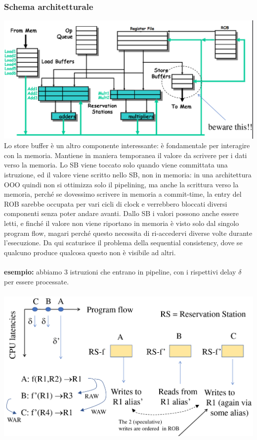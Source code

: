 \documentclass[12pt, oneside]{extbook}
\begin{document}
\subsubsection{Schema architetturale}
\includegraphics[scale=0.25]{immagini/arch-moderna}\\
Lo store buffer è un altro componente interessante: è fondamentale per interagire con la memoria. Mantiene in maniera temporanea il valore da scrivere per i dati verso la memoria. Lo SB viene toccato solo quando viene committata una istruzione, ed il valore viene scritto nello SB, non in memoria: in una architettura OOO quindi non si ottimizza solo il pipelining, ma anche la scrittura verso la memoria, perché se dovessimo scrivere in memoria a commit-time, la entry del ROB sarebbe occupata per vari cicli di clock e verrebbero bloccati diversi componenti senza poter andare avanti. Dallo SB i valori possono anche essere letti, e finché il valore non viene riportano in memoria è visto solo dal singolo program flow, magari perché questo necessita di ri-accedervi diverse volte durante l'esecuzione. Da qui scaturisce il problema della sequential consistency, dove se qualcuno produce qualcosa questo non è visibile ad altri.\\\\ \textbf{esempio:} abbiamo 3 istruzioni che entrano in pipeline, con i rispettivi delay $\delta$ per essere processate.
\\\\
\includegraphics[scale=0.25]{immagini/ex-pipeline}
\end{document}
